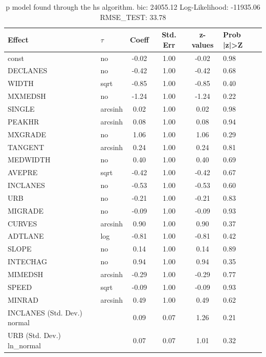 \begin{table}
	\caption{p model found through the hs algorithm. bic: 24055.12 Log-Likelihood: -11935.06 RMSE_TEST: 33.78}
	\begin{center}
		\begin{tabular}{|l|l|c|c|c|l|}
			\hline
			Effect & $\tau$ & Coeff & Std. Err & z-values & Prob |z|>Z \\
			\hline
			const & no & -0.02 & 1.00 & -0.02 & 0.98 \\
			\hline
			DECLANES & no & -0.42 & 1.00 & -0.42 & 0.68 \\
			\hline
			WIDTH & sqrt & -0.85 & 1.00 & -0.85 & 0.40 \\
			\hline
			MXMEDSH & no & -1.24 & 1.00 & -1.24 & 0.22 \\
			\hline
			SINGLE & arcsinh & 0.02 & 1.00 & 0.02 & 0.98 \\
			\hline
			PEAKHR & arcsinh & 0.08 & 1.00 & 0.08 & 0.94 \\
			\hline
			MXGRADE & no & 1.06 & 1.00 & 1.06 & 0.29 \\
			\hline
			TANGENT & arcsinh & 0.24 & 1.00 & 0.24 & 0.81 \\
			\hline
			MEDWIDTH & no & 0.40 & 1.00 & 0.40 & 0.69 \\
			\hline
			AVEPRE & sqrt & -0.42 & 1.00 & -0.42 & 0.67 \\
			\hline
			INCLANES & no & -0.53 & 1.00 & -0.53 & 0.60 \\
			\hline
			URB & no & -0.21 & 1.00 & -0.21 & 0.83 \\
			\hline
			MIGRADE & no & -0.09 & 1.00 & -0.09 & 0.93 \\
			\hline
			CURVES & arcsinh & 0.90 & 1.00 & 0.90 & 0.37 \\
			\hline
			ADTLANE & log & -0.81 & 1.00 & -0.81 & 0.42 \\
			\hline
			SLOPE & no & 0.14 & 1.00 & 0.14 & 0.89 \\
			\hline
			INTECHAG & no & 0.94 & 1.00 & 0.94 & 0.35 \\
			\hline
			MIMEDSH & arcsinh & -0.29 & 1.00 & -0.29 & 0.77 \\
			\hline
			SPEED & sqrt & -0.09 & 1.00 & -0.09 & 0.93 \\
			\hline
			MINRAD & arcsinh & 0.49 & 1.00 & 0.49 & 0.62 \\
			\hline
			INCLANES (Std. Dev.) normal &  & 0.09 & 0.07 & 1.26 & 0.21 \\
			\hline
			URB (Std. Dev.) ln_normal &  & 0.07 & 0.07 & 1.01 & 0.32 \\

\end{tabular}
\end{center}
\end{table}
